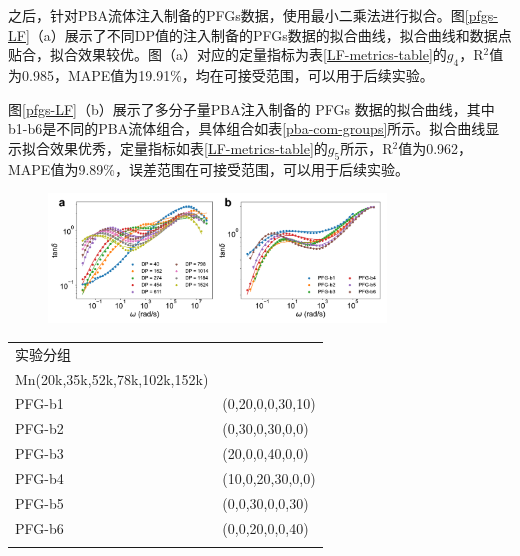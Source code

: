 之后，针对PBA流体注入制备的PFGs数据，使用最小二乘法进行拟合。图\ref{pfgs-LF}（a）展示了不同DP值的注入制备的PFGs数据的拟合曲线，拟合曲线和数据点贴合，拟合效果较优。图（a）对应的定量指标为表\ref{LF-metrics-table}的$g_4$，R$^2$值为0.985，MAPE值为19.91\%，均在可接受范围，可以用于后续实验。

图\ref{pfgs-LF}（b）展示了多分子量PBA注入制备的 PFGs 数据的拟合曲线，其中b1-b6是不同的PBA流体组合，具体组合如表\ref{pba-com-groups}所示。拟合曲线显示拟合效果优秀，定量指标如表\ref{LF-metrics-table}的$g_5$所示，R$^2$值为0.962，MAPE值为9.89\%，误差范围在可接受范围，可以用于后续实验。
\begin{figure}[htbp]
  \centering
  \includegraphics[width=0.8\textwidth]{Fig/pfgs-LF.pdf}
\end{figure}

\begin{table}
  \centering
  \small
  \begin{tabularx}{\textwidth}{>{\centering\arraybackslash}X >{\centering\arraybackslash}X} %
    \Xhline{1.5pt}
    实验分组   & \makecell{
      \begin{tabular}{@{}c@{}}
        $\phi_{PBA}(\%)$ \\
        \Xhline{0.5pt}
        Mn(20k,35k,52k,78k,102k,152k)
      \end{tabular}
    }                         \\
    \Xhline{0.5pt}
    PFG-b1 & (0,20,0,0,30,10) \\
    PFG-b2 & (0,30,0,30,0,0)  \\
    PFG-b3 & (20,0,0,40,0,0)  \\
    PFG-b4 & (10,0,20,30,0,0) \\
    PFG-b5 & (0,0,30,0,0,30)  \\
    PFG-b6 & (0,0,20,0,0,40)  \\
    \Xhline{1.5pt}
  \end{tabularx}
\end{table}

